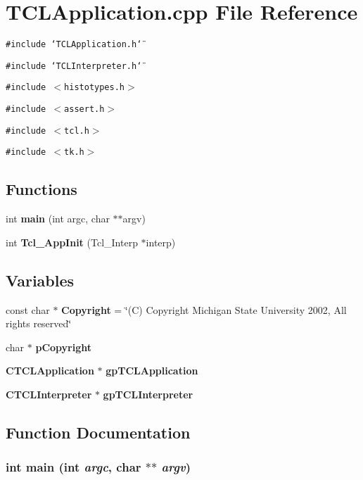\section{TCLApplication.cpp File Reference}
\label{TCLApplication_8cpp}
{\tt \#include \char`\"{}TCLApplication.h\char`\"{}}\par
{\tt \#include \char`\"{}TCLInterpreter.h\char`\"{}}\par
{\tt \#include $<$histotypes.h$>$}\par
{\tt \#include $<$assert.h$>$}\par
{\tt \#include $<$tcl.h$>$}\par
{\tt \#include $<$tk.h$>$}\par
\subsection*{Functions}
\begin{CompactItemize}
\item 
int {\bf main} (int argc, char $\ast$$\ast$argv)
\item 
int {\bf Tcl\_\-App\-Init} (Tcl\_\-Interp $\ast$interp)
\end{CompactItemize}
\subsection*{Variables}
\begin{CompactItemize}
\item 
const char $\ast$ {\bf Copyright} = \char`\"{}(C) Copyright Michigan State University 2002, All rights reserved\char`\"{}
\item 
char $\ast$ {\bf p\-Copyright}
\item 
{\bf CTCLApplication} $\ast$ {\bf gp\-TCLApplication}
\item 
{\bf CTCLInterpreter} $\ast$ {\bf gp\-TCLInterpreter}
\end{CompactItemize}


\subsection{Function Documentation}
\subsubsection{\setlength{\rightskip}{0pt plus 5cm}int main (int {\em argc}, char $\ast$$\ast$ {\em argv})}\label{TCLApplication_8cpp_a4}




